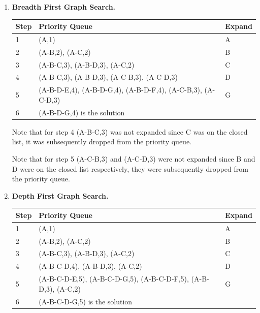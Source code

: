 \documentclass[11pt]{article}
\begin{document}
  \begin{enumerate}

  \item {\bf Breadth First Graph Search.} \\    

    \begin{center}
    \begin{tabular}{|l|l@{\hspace*{1in}}|l|} \hline
    \bf Step & \bf Priority Queue & \bf Expand \\ \hline
    1 & (A,1) & A \\ \hline
    2 & (A-B,2), (A-C,2) & B \\ \hline
    3 & (A-B-C,3), (A-B-D,3), (A-C,2) & C \\ \hline
    4 & (A-B-C,3), (A-B-D,3), (A-C-B,3), (A-C-D,3) & D \\ \hline
    5 & (A-B-D-E,4), (A-B-D-G,4), (A-B-D-F,4), (A-C-B,3), (A-C-D,3) & G \\ \hline
    6 & (A-B-D-G,4) is the solution &  \\ \hline
    \end{tabular}
    \end{center}
  
    Note that for step 4 (A-B-C,3) was not expanded since C was on the closed list, it was subsequently dropped from the priority queue.

    Note that for step 5 (A-C-B,3) and (A-C-D,3) were not expanded since B and D were on the closed list respectively, they were subsequently dropped from the priority queue.

\clearpage

  \item {\bf Depth First Graph Search.} \\

    \begin{center}
    \begin{tabular}{|l|l@{\hspace*{1in}}|l|} \hline
    \bf Step & \bf Priority Queue & \bf Expand \\ \hline
    1 & (A,1) & A \\ \hline
    2 & (A-B,2), (A-C,2) & B \\ \hline
    3 & (A-B-C,3), (A-B-D,3), (A-C,2) & C \\ \hline
    4 & (A-B-C-D,4), (A-B-D,3), (A-C,2) & D \\ \hline
    5 & (A-B-C-D-E,5), (A-B-C-D-G,5), (A-B-C-D-F,5), (A-B-D,3), (A-C,2) & G \\ \hline
    6 & (A-B-C-D-G,5) is the solution &  \\ \hline
    \end{tabular}
    \end{center}


\end{enumerate}
\end{document}
